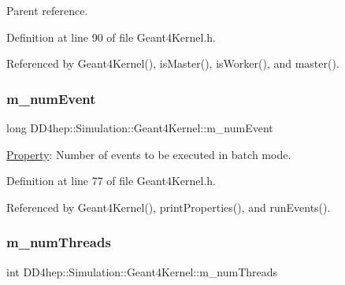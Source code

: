 Parent reference. 



Definition at line 90 of file Geant4\+Kernel.\+h.



Referenced by Geant4\+Kernel(), is\+Master(), is\+Worker(), and master().

\hypertarget{class_d_d4hep_1_1_simulation_1_1_geant4_kernel_a5786c0e6c67534e109595f568df489a9}{}\label{class_d_d4hep_1_1_simulation_1_1_geant4_kernel_a5786c0e6c67534e109595f568df489a9} 
\subsubsection{\texorpdfstring{m\+\_\+num\+Event}{m\_numEvent}}
{\footnotesize\ttfamily long D\+D4hep\+::\+Simulation\+::\+Geant4\+Kernel\+::m\+\_\+num\+Event\hspace{0.3cm}{\ttfamily [protected]}}



\hyperlink{class_d_d4hep_1_1_property}{Property}\+: Number of events to be executed in batch mode. 



Definition at line 77 of file Geant4\+Kernel.\+h.



Referenced by Geant4\+Kernel(), print\+Properties(), and run\+Events().

\hypertarget{class_d_d4hep_1_1_simulation_1_1_geant4_kernel_a402cfabce5a04002713b4e35569911d7}{}\label{class_d_d4hep_1_1_simulation_1_1_geant4_kernel_a402cfabce5a04002713b4e35569911d7} 
\subsubsection{\texorpdfstring{m\+\_\+num\+Threads}{m\_numThreads}}
{\footnotesize\ttfamily int D\+D4hep\+::\+Simulation\+::\+Geant4\+Kernel\+::m\+\_\+num\+Threads\hspace{0.3cm}{\ttfamily [protected]}}



